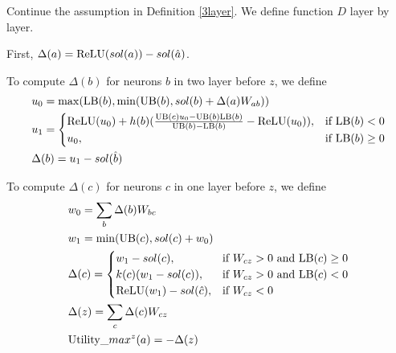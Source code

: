 \begin{definition}
	Continue the assumption in Definition \ref{3layer}. We define function $D$ layer by layer.
	
	First, $\Delta(a) = \mathrm{ReLU}(sol(a))-sol(\hat{a})$.
	
To compute $\Delta(b)$ for neurons $b$ in two layer before $z$, we define \begin{align}
	&u_0 = \max(\mathrm{LB}(b),\min(\mathrm{UB}(b),  sol(b)+\Delta(a)W_{ab}))\\
	&u_1 = \begin{cases}
		\mathrm{ReLU}(u_0)+h(b)(\frac{\mathrm{UB}(c)u_0-\mathrm{UB}(b)\mathrm{LB}(b)}{\mathrm{UB}(b)-\mathrm{LB}(b)}-\mathrm{ReLU}(u_0)), & \text{if }\mathrm{LB}(b) < 0\\
	u_0, & \text{if }  \mathrm{LB}(b) \geq 0
	\end{cases}\\
	&\Delta(b) = u_1-sol(\hat{b})
\end{align}
	
	To compute $\Delta(c)$ for neurons $c$ in one layer before $z$, we define 
	\begin{align}
		&w_0 = \sum_b \Delta(b)W_{bc}\\
		&w_1 = \min(\mathrm{UB}(c),sol(c)+w_0)\\		
		&\Delta(c) =
		\begin{cases}
			w_1-sol({c}), & \text{if }W_{cz} > 0 \text{ and } \mathrm{LB}(c)\geq 0\\
		k(c)(w_1-sol({c})), & \text{if }W_{cz} > 0 \text{ and } \mathrm{LB}(c)< 0\\
		\mathrm{ReLU}(w_1)-sol(\hat{c})	, & \text{if }  W_{cz} < 0
		\end{cases}\\
		&\Delta(z) = \sum_c \Delta(c)W_{cz}\\
		&\mathrm{Utility}\_max^z(a) = -\Delta(z)
	\end{align}
\end{definition}
		
\fi